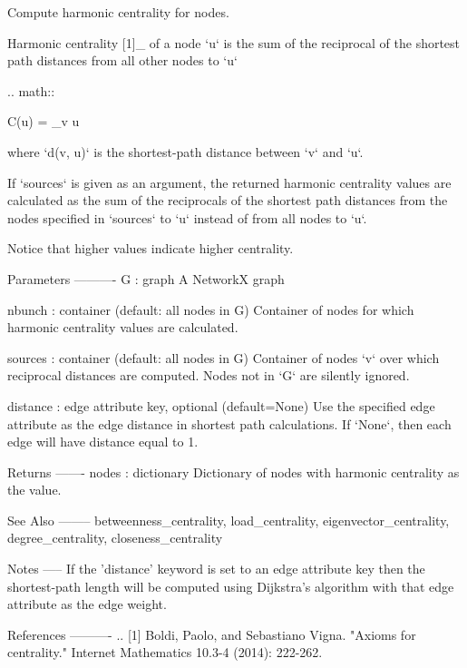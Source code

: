 \begin{DoxyVerb}Compute harmonic centrality for nodes.

Harmonic centrality [1]_ of a node `u` is the sum of the reciprocal
of the shortest path distances from all other nodes to `u`

.. math::

    C(u) = \sum_{v \neq u} 

where `d(v, u)` is the shortest-path distance between `v` and `u`.

If `sources` is given as an argument, the returned harmonic centrality
values are calculated as the sum of the reciprocals of the shortest
path distances from the nodes specified in `sources` to `u` instead
of from all nodes to `u`.

Notice that higher values indicate higher centrality.

Parameters
----------
G : graph
  A NetworkX graph

nbunch : container (default: all nodes in G)
  Container of nodes for which harmonic centrality values are calculated.

sources : container (default: all nodes in G)
  Container of nodes `v` over which reciprocal distances are computed.
  Nodes not in `G` are silently ignored.

distance : edge attribute key, optional (default=None)
  Use the specified edge attribute as the edge distance in shortest
  path calculations.  If `None`, then each edge will have distance equal to 1.

Returns
-------
nodes : dictionary
  Dictionary of nodes with harmonic centrality as the value.

See Also
--------
betweenness_centrality, load_centrality, eigenvector_centrality,
degree_centrality, closeness_centrality

Notes
-----
If the 'distance' keyword is set to an edge attribute key then the
shortest-path length will be computed using Dijkstra's algorithm with
that edge attribute as the edge weight.

References
----------
.. [1] Boldi, Paolo, and Sebastiano Vigna. "Axioms for centrality."
       Internet Mathematics 10.3-4 (2014): 222-262.
\end{DoxyVerb}
 